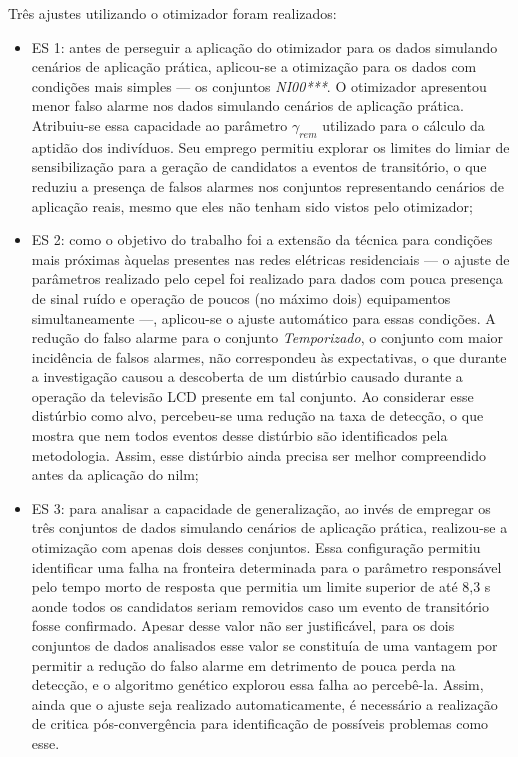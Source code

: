 Três ajustes utilizando o otimizador foram realizados:

\begin{itemize}
\item ES 1: antes de perseguir a aplicação do otimizador para os dados
simulando cenários de aplicação prática, aplicou-se a otimização para
os dados com condições mais simples --- os conjuntos \emph{NI00***}.
O otimizador apresentou menor falso alarme nos dados simulando
cenários de aplicação prática. Atribuiu-se essa capacidade ao
parâmetro $\gamma_{rem}$ utilizado para o cálculo da aptidão dos
indivíduos. Seu emprego permitiu explorar os limites do limiar de
sensibilização para a geração de candidatos a eventos de transitório,
o que reduziu a presença de falsos alarmes nos conjuntos representando
cenários de aplicação reais, mesmo que eles não tenham sido vistos
pelo otimizador;
\item ES 2: como o objetivo do trabalho foi a extensão da técnica para
condições mais próximas àquelas presentes nas redes elétricas
residenciais --- o ajuste de parâmetros realizado pelo \acs{cepel} foi
realizado para dados com pouca presença de sinal ruído e operação de
poucos (no máximo dois) equipamentos simultaneamente ---, aplicou-se o
ajuste automático para essas condições. A redução do falso alarme para
o conjunto \emph{Temporizado}, o conjunto com maior incidência de
falsos alarmes, não correspondeu às expectativas, o que durante a
investigação causou a descoberta de um distúrbio causado durante a
operação da televisão LCD presente em tal conjunto. Ao considerar esse
distúrbio como alvo, percebeu-se uma redução na taxa de detecção, o
que mostra que nem todos eventos desse distúrbio são identificados
pela metodologia. Assim, esse distúrbio ainda precisa ser melhor
compreendido antes da aplicação do \acs{nilm};
\item ES 3: para analisar a capacidade de generalização, ao invés de
empregar os três conjuntos de dados simulando cenários de aplicação
prática, realizou-se a otimização com apenas dois desses conjuntos.
Essa configuração permitiu identificar uma falha na fronteira
determinada para o parâmetro responsável pelo tempo morto de resposta
que permitia um limite superior de até 8,3 s aonde todos os candidatos
seriam removidos caso um evento de transitório fosse confirmado.
Apesar desse valor não ser justificável, para os dois conjuntos de
dados analisados esse valor se constituía de uma vantagem por permitir
a redução do falso alarme em detrimento de pouca perda na detecção, e
o algoritmo genético explorou essa falha ao percebê-la. Assim, ainda
que o ajuste seja realizado automaticamente, é necessário a realização
de critica pós-convergência para identificação de possíveis problemas
como esse. 
\end{itemize}

